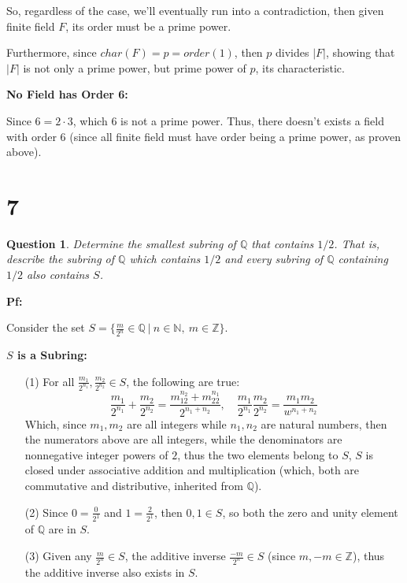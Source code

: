 \documentclass{article}
\newtheorem{question}{Question}
\begin{document}
\hfill

So, regardless of the case, we'll eventually run into a contradiction, then given finite field $F$, its order must be a prime power.

Furthermore, since $char(F)=p=order(1)$, then $p$ divides $|F|$, showing that $|F|$ is not only a prime power, but prime power of $p$, its characteristic.

\hfill

\hfill

\textbf{No Field has Order 6:}

Since $6=2\cdot 3$, which $6$ is not a prime power. Thus, there doesn't exists a field with order $6$ (since all finite field must have order being a prime power, as proven above).




\break


\section*{7}
\begin{myBox}[]{}
    \begin{question}
        Determine the smallest subring of $\mathbb{Q}$ that contains $1/2$. That is, describe the subring
        of $\mathbb{Q}$ which contains $1/2$ and every subring of $\mathbb{Q}$ containing $1/2$ also contains $S$.
    \end{question}
\end{myBox}

\textbf{Pf:}

Consider the set $S=\{\frac{m}{2^n}\in\mathbb{Q}\ |\ n\in\mathbb{N},\ m\in\mathbb{Z}\}$.

\hfill

\textbf{$S$ is a Subring:}
\begin{itemize}
    \item[(1)] For all $\frac{m_1}{2^{n_1}},\frac{m_2}{2^{n_2}}\in S$, the following are true:
    $$\frac{m_1}{2^{n_1}}+\frac{m_2}{2^{n_2}}=\frac{m_12^{n_2}+m_22^{n_1}}{2^{n_1+n_2}},\quad \frac{m_1}{2^{n_1}}\frac{m_2}{2^{n_2}}=\frac{m_1m_2}{w^{n_1+n_2}}$$
    Which, since $m_1,m_2$ are all integers while $n_1,n_2$ are natural numbers, then the numerators above are all integers, while the denominators are nonnegative integer powers of $2$,
    thus the two elements belong to $S$, $S$ is closed under associative addition and multiplication (which, both are commutative and distributive, inherited from $\mathbb{Q}$).

    \hfill

    \item[(2)] Since $0 = \frac{0}{2^1}$ and $1=\frac{2}{2^1}$, then $0,1\in S$, so both the zero and unity element of $\mathbb{Q}$ are in $S$.
    
    \hfill

    \item[(3)] Given any $\frac{m}{2^n}\in S$, the additive inverse $\frac{-m}{2^n}\in S$ (since $m,-m\in \mathbb{Z}$), thus the additive inverse also exists in $S$.
\end{itemize}
\end{document}
